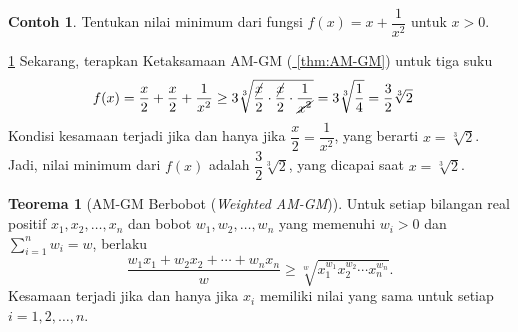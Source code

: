 \documentclass[aspectratio=169]{beamer}
\theoremstyle{definition}
\newtheorem{teorema}{Teorema}
\newtheorem{contoh}{Contoh}
\newcommand{\myref}[1]{\hyperref[#1]{\nameCref{#1} \ref*{#1}}}
\begin{document}
\begin{frame}{\insertsection}{\insertsubsection}
  \begin{contoh}
    Tentukan nilai minimum dari fungsi $f(x) = x + \dfrac{1}{x^2}$ untuk $x > 0$.\label{cth:AM-GM}

  \end{contoh}
\end{frame}

\begin{frame}{\insertsection}{\insertsubsection}
  \begin{exampleblock}{\myref{cth:AM-GM}}
    Sekarang, terapkan Ketaksamaan AM-GM (\myref{thm:AM-GM}) untuk tiga suku
    \begin{align*}
      f(x) = \frac{x}{2} + \frac{x}{2} + \frac{1}{x^2} & \ge 3\sqrt[3]{\frac{\cancel{ x }}{2} \cdot \frac{\cancel{ x }}{2} \cdot \frac{1}{\cancel{ x^2 }}}= 3\sqrt[3]{\frac{1}{4}} = \frac{3}{2}\sqrt[3]{2}
    \end{align*}
    Kondisi kesamaan terjadi jika dan hanya jika $\dfrac{x}{2} = \dfrac{1}{x^2}$, yang berarti $x = \sqrt[3]{2}$. Jadi, nilai minimum dari $f(x)$ adalah $\dfrac{3}{2}\sqrt[3]{2}$, yang dicapai saat $x = \sqrt[3]{2}$.
  \end{exampleblock}
\end{frame}
\begin{frame}{\insertsection}{\insertsubsection}
  \begin{teorema}[AM-GM Berbobot (\textit{Weighted AM-GM})\label{thm:weighted-AM-GM}]
    Untuk setiap bilangan real positif $x_1, x_2, \ldots, x_n$ dan bobot $w_1, w_2, \ldots, w_n$ yang memenuhi $w_i > 0$ dan $\sum_{i=1}^n w_i = w$, berlaku
    \[
      \frac{w_1 x_1 + w_2 x_2 + \cdots + w_n x_n}{w} \geq \sqrt[w]{x_1^{w_1} x_2^{w_2} \cdots x_n^{w_n}}.
    \]
    Kesamaan terjadi jika dan hanya jika $x_i$ memiliki nilai yang sama untuk setiap $i=1,2,\dots,n$.
  \end{teorema}
\end{frame}
\end{document}
